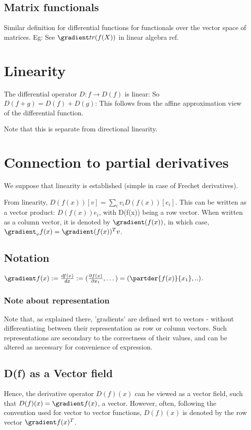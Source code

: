 \documentclass[oneside, article]{memoir}
\begin{document}
\subsection{Matrix functionals}
Similar definition for differential functions for functionals over the vector space of matrices. Eg: See $\gradient tr(f(X))$ in linear algebra ref.

\section{Linearity}
The differential operator $D:f \to D(f)$ is linear: So $D(f+g) = D(f) + D(g)$: This follows from the affine approximation view  of the differential function.

Note that this is separate from directional linearity.

\section{Connection to partial derivatives}
We suppose that linearity is established (simple in case of Frechet derivatives).

From linearity, $D(f(x))[v] = \sum_i v_i D(f(x))[e_i]$. This can be written as a vector product: $D(f(x))e_i$, with D(f(x)) being a row vector. When written as a column vector, it is denoted by $\gradient(f(x)) $, in which case, $\gradient_v f(x) = \gradient(f(x))^{T}v$.

\subsection{Notation}
$\gradient f(x) := \frac{df(x)}{dx} := (\frac{\partial f(x)}{\partial x_{1}}, \dots) = (\partder{f(x)}{x_{1}}, ..)$.

\subsubsection{Note about representation}
Note that, as explained there, 'gradients' are defined wrt to vectors - without differentiating between their representation as row or column vectors. Such representations are secondary to the correctness of their values, and can be altered as necessary for convenience of expression.

\subsection{D(f) as a Vector field}
Hence, the derivative operator $D(f)(x)$ can be viewed as a vector field, such that $D(f)(x) = \gradient f(x)$, a vector. However, often, following the convention used for vector to vector functions, $D(f)(x)$ is denoted by the row vector $\gradient f(x)^{T}$.
\end{document}

